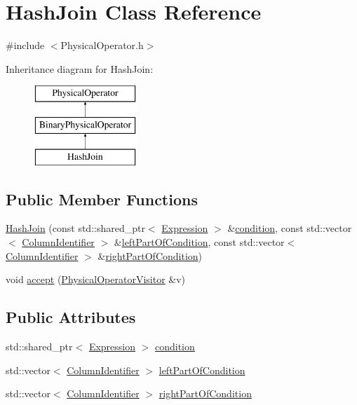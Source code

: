 \hypertarget{class_hash_join}{\section{Hash\+Join Class Reference}
\label{class_hash_join}
}


{\ttfamily \#include $<$Physical\+Operator.\+h$>$}

Inheritance diagram for Hash\+Join\+:\begin{figure}[H]
\begin{center}
\leavevmode
\includegraphics[height=3.000000cm]{class_hash_join}
\end{center}
\end{figure}
\subsection*{Public Member Functions}
\begin{DoxyCompactItemize}
\item 
\hyperlink{class_hash_join_aade828aa470db22861011b21f1335111}{Hash\+Join} (const std\+::shared\+\_\+ptr$<$ \hyperlink{class_expression}{Expression} $>$ \&\hyperlink{class_hash_join_ac2524a0455d2379287a55d8cb148c40d}{condition}, const std\+::vector$<$ \hyperlink{class_column_identifier}{Column\+Identifier} $>$ \&\hyperlink{class_hash_join_a8ce73a163fdc30d10144277b51689541}{left\+Part\+Of\+Condition}, const std\+::vector$<$ \hyperlink{class_column_identifier}{Column\+Identifier} $>$ \&\hyperlink{class_hash_join_ad4f1b144fc9a52d5218b1d2368c295b7}{right\+Part\+Of\+Condition})
\item 
void \hyperlink{class_hash_join_a11dc03e38397ff42352772a3c759e145}{accept} (\hyperlink{class_physical_operator_visitor}{Physical\+Operator\+Visitor} \&v)
\end{DoxyCompactItemize}
\subsection*{Public Attributes}
\begin{DoxyCompactItemize}
\item 
std\+::shared\+\_\+ptr$<$ \hyperlink{class_expression}{Expression} $>$ \hyperlink{class_hash_join_ac2524a0455d2379287a55d8cb148c40d}{condition}
\item 
std\+::vector$<$ \hyperlink{class_column_identifier}{Column\+Identifier} $>$ \hyperlink{class_hash_join_a8ce73a163fdc30d10144277b51689541}{left\+Part\+Of\+Condition}
\item 
std\+::vector$<$ \hyperlink{class_column_identifier}{Column\+Identifier} $>$ \hyperlink{class_hash_join_ad4f1b144fc9a52d5218b1d2368c295b7}{right\+Part\+Of\+Condition}
\end{DoxyCompactItemize}


